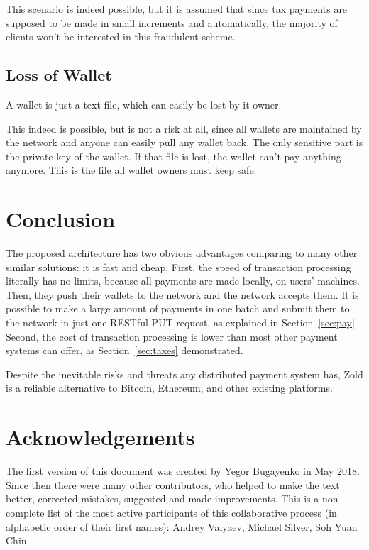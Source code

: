 \documentclass[11pt,oneside]{article}
\begin{document}
This scenario is indeed possible, but it is assumed that since tax payments are
supposed to be made in small increments and automatically, the majority of
clients won't be interested in this fraudulent scheme.

\subsection{Loss of Wallet}

A wallet is just a text file, which can easily be lost by it owner.

This indeed is possible, but is not a risk at all, since all wallets are
maintained by the network and anyone can easily pull any wallet back.
The only sensitive part is the private key of the wallet. If that file
is lost, the wallet can't pay anything anymore. This is the file all
wallet owners must keep safe.

\section{Conclusion}

The proposed architecture has two obvious advantages comparing to many other
similar solutions: it is fast and cheap. First, the speed of transaction processing
literally has no limits, because all payments are made locally, on users'
machines. Then, they push their wallets to the network and the network accepts
them. It is possible to make a large amount of payments in one batch and
submit them to the network in just one RESTful PUT request, as explained
in Section~\ref{sec:pay}. Second, the cost of transaction processing
is lower than most other payment systems can offer, as Section~\ref{sec:taxes}
demonstrated.

Despite the inevitable risks and threats any distributed payment system
has, Zold is a reliable alternative to Bitcoin, Ethereum, and
other existing platforms.

\section{Acknowledgements}

The first version of this document was created by Yegor Bugayenko in May 2018.
Since then there were many other contributors, who helped to make the text better,
corrected mistakes, suggested and made improvements. This is a non-complete list
of the most active participants of this collaborative process
(in alphabetic order of their first names):
%
Andrey Valyaev,
Michael Silver,
Soh Yuan Chin.

\raggedright
\printbibliography%
\end{document}
